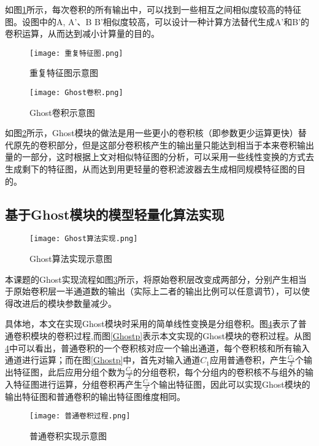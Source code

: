 如图\ref{identical}所示，每次卷积的所有输出中，可以找到一些相互之间相似度较高的特征图。设图中的A, A’、B B’相似度较高，可以设计一种计算方法替代生成A’和B’的卷积运算，从而达到减小计算量的目的。

\begin{figure}[htbp]
    \centering
    \texttt{[image: 重复特征图.png]}
    \caption{重复特征图示意图}
    \label{identical}
\end{figure}

\begin{figure}[htbp]
    \centering
    \texttt{[image: Ghost卷积.png]}
    \caption{Ghost卷积示意图}
    \label{Ghost1}
\end{figure}

如图\ref{Ghost1}所示，Ghost模块的做法是用一些更小的卷积核（即参数更少运算更快）替代原先的卷积部分，但是这部分卷积核产生的输出量只能达到相当于本来卷积输出量的一部分，这时根据上文对相似特征图的分析，可以采用一些线性变换的方式去生成剩下的特征图，从而达到用更轻量的卷积滤波器去生成相同规模特征图的目的。

\subsection{基于Ghost模块的模型轻量化算法实现}

\begin{figure}[htbp]
    \centering
    \texttt{[image: Ghost算法实现.png]}
    \caption{Ghost算法实现示意图}
    \label{Ghost2}
\end{figure}

本课题的Ghost实现流程如图\ref{Ghost2}所示，将原始卷积层改变成两部分，分别产生相当于原始卷积层一半通道数的输出（实际上二者的输出比例可以任意调节），可以使得改进后的模块参数量减少。

具体地，本文在实现Ghost模块时采用的简单线性变换是分组卷积。图\ref{convp}表示了普通卷积模块的卷积过程,而图\ref{Ghostp}表示本文实现的Ghost模块的卷积过程。从图\ref{convp}中可以看出，普通卷积的一个卷积核对应一个输出通道，每个卷积核和所有输入通道进行运算；而在图\ref{Ghostp}中，首先对输入通道$C_1$应用普通卷积，产生$\frac{C_2}{2}$个输出特征图，此后应用分组个数为$\frac{C_2}{2}$的分组卷积，每个分组内的卷积核不与组外的输入特征图进行运算，分组卷积再产生$\frac{C_2}{2}$个输出特征图，因此可以实现Ghost模块的输出特征图和普通卷积的输出特征图维度相同。
\begin{figure}[htbp]
    \centering
    \texttt{[image: 普通卷积过程.png]}
    \caption{普通卷积实现示意图}
    \label{convp}
\end{figure}

